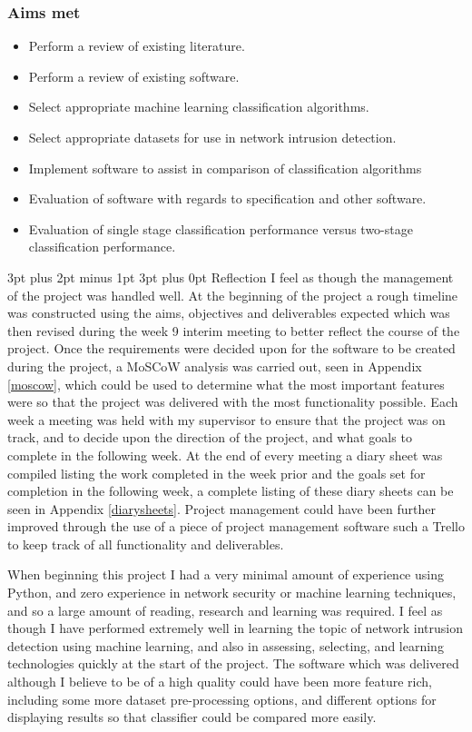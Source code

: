 \documentclass[12pt,a4paper]{article}
\makeatletter
\renewcommand\subsection{\@startsection {subsection}{1}{2mm} %
      {3pt plus 2pt minus 1pt} %
      {3pt plus 0pt} %
      {\normalfont\bfseries}}
\makeatother
\begin{document}
\subsubsection{Aims met}
\begin{itemize}
	\item{Perform a review of existing literature.}
	\item{Perform a review of existing software.}
	\item{Select appropriate machine learning classification algorithms.}
	\item{Select appropriate datasets for use in network intrusion detection.}
	\item{Implement software to assist in comparison of classification algorithms}
	\item{Evaluation of software with regards to specification and other software.}
	\item{Evaluation of single stage classification performance versus two-stage classification performance.}
\end{itemize}
\subsection{Reflection}
I feel as though the management of the project was handled well. At the beginning of the project a rough timeline was constructed using the aims, objectives and deliverables expected which was then revised during the week 9 interim meeting to better reflect the course of the project. Once the requirements were decided upon for the software to be created during the project, a MoSCoW analysis was carried out, seen in Appendix \ref{moscow}, which could be used to determine what the most important features were so that the project was delivered with the most functionality possible. Each week a meeting was held with my supervisor to ensure that the project was on track, and to decide upon the direction of the project, and what goals to complete in the following week. At the end of every meeting a diary sheet was compiled listing the work completed in the week prior and the goals set for completion in the following week, a complete listing of these diary sheets can be seen in Appendix \ref{diarysheets}. Project management could have been further improved through the use of a piece of project management software such a Trello to keep track of all functionality and deliverables.

When beginning this project I had a very minimal amount of experience using Python, and zero experience in network security or machine learning techniques, and so a large amount of reading, research and learning was required. I feel as though I have performed extremely well in learning the topic of network intrusion detection using machine learning, and also in assessing, selecting, and learning technologies quickly at the start of the project. The software which was delivered although I believe to be of a high quality could have been more feature rich, including some more dataset pre-processing options, and different options for displaying results so that classifier could be compared more easily.
\end{document}
